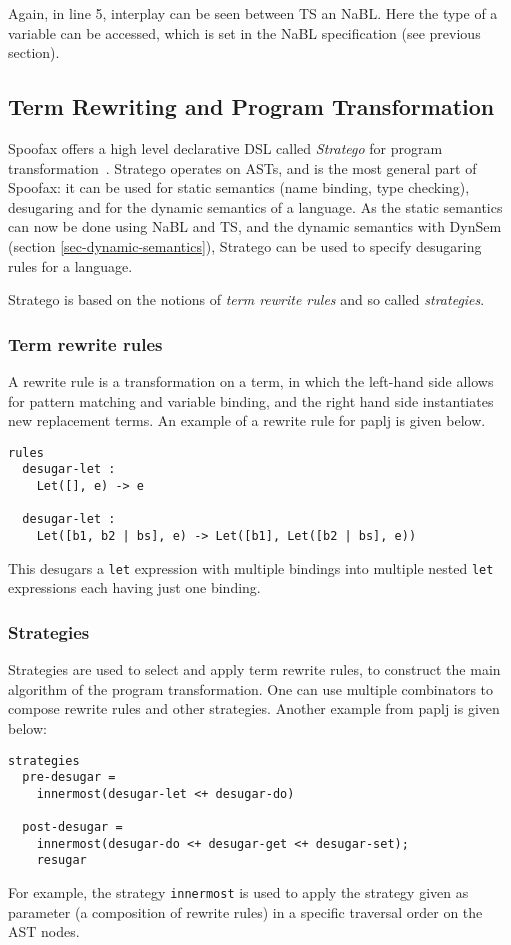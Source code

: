 Again, in line 5, interplay can be seen between TS an NaBL. Here the
type of a variable can be accessed, which is set in the NaBL
specification (see previous section).
\subsection{Term Rewriting and Program Transformation}
\label{sec-term-rewrite}
Spoofax offers a high level declarative DSL called \emph{Stratego} for
program transformation~\cite{Visser01}. Stratego operates on ASTs,
and is the most general part of Spoofax: it can be used for static
semantics (name binding, type checking), desugaring and for the
dynamic semantics of a language. As the static semantics can now be
done using NaBL and TS, and the dynamic semantics with DynSem (section
\ref{sec-dynamic-semantics}), Stratego can be used to specify desugaring
rules for a language.

Stratego is based on the notions of \emph{term rewrite rules} and so called
\emph{strategies}.
\subsubsection{Term rewrite rules}
\label{sec:orgheadline5}
A rewrite rule is a transformation on a term, in which the left-hand
side allows for pattern matching and variable binding, and the right
hand side instantiates new replacement terms. An example of a rewrite
rule for paplj is given below.
\begin{verbatim}
rules
  desugar-let :
  	Let([], e) -> e

  desugar-let :
  	Let([b1, b2 | bs], e) -> Let([b1], Let([b2 | bs], e))
\end{verbatim}
This desugars a \texttt{let} expression with multiple bindings into multiple
nested \texttt{let} expressions each having just one binding.
\subsubsection{Strategies}
\label{sec:orgheadline6}
Strategies are used to select and apply term rewrite rules, to
construct the main algorithm of the program transformation. One can
use multiple combinators to compose rewrite rules and other
strategies. Another example from paplj is given below:
\begin{verbatim}
strategies
  pre-desugar =
    innermost(desugar-let <+ desugar-do)

  post-desugar =
    innermost(desugar-do <+ desugar-get <+ desugar-set);
    resugar
\end{verbatim}
For example, the strategy \texttt{innermost} is used to apply the strategy
given as parameter (a composition of rewrite rules) in a specific
traversal order on the AST nodes.
